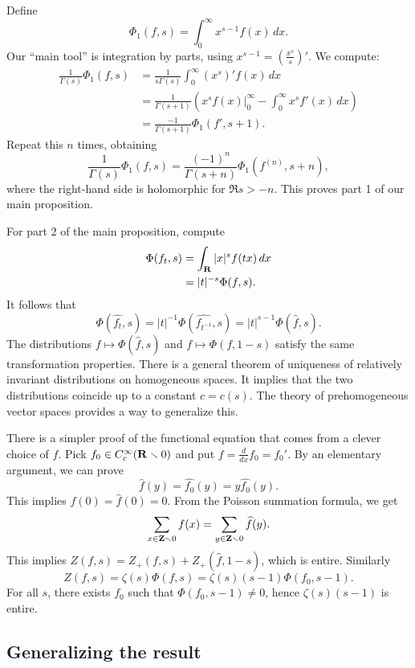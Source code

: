 Define 
\[
  \Phi_1(f,s) = \int_0^\infty x^{s-1} f(x)\, dx .
\]
Our ``main tool'' is integration by parts, using 
$x^{s-1} = \left(\frac{x^s}{s}\right)'$. We compute: 
\begin{align*}
  \frac{1}{\Gamma(s)} \Phi_1(f,s) 
    &= \frac{1}{s \Gamma(s)} \int_0^\infty (x^s)' f(x)\, dx \\
    &= \frac{1}{\Gamma(s+1)} \left(\left. x^s f(x)\right|_0^\infty - \int_0^\infty x^s f'(x)\, dx \right) \\
    &= \frac{-1}{\Gamma(s+1)} \Phi_1(f',s+1) .
\end{align*}
Repeat this $n$ times, obtaining 
\[
  \frac{1}{\Gamma(s)} \Phi_1(f,s) = \frac{(-1)^n}{\Gamma(s+n)} \Phi_1(f^{(n)},s+n) ,
\]
where the right-hand side is holomorphic for $\Re s>-n$. This proves part 1 of 
our main proposition. 

For part 2 of the main proposition, compute 
\begin{align*}
  \Phi(f_t,s) 
    &= \int_{\mathbf{R}} |x|^s f(t x)\, dx \\
    &= |t|^{-s} \Phi(f,s) .
\end{align*}
It follows that  
\[
  \Phi(\widehat{f_t},s) = |t|^{-1} \Phi(\widehat{f_{t^{-1}}},s) = |t|^{s-1} \Phi(\widehat f,s) .
\]
The distributions $f\mapsto \Phi(\widehat f,s)$ and $f\mapsto \Phi(f,1-s)$ 
satisfy the same transformation properties. There is a general theorem of 
uniqueness of relatively invariant distributions on homogeneous spaces. It 
implies that the two distributions coincide up to a constant $c=c(s)$. 
The theory of prehomogeneous vector spaces provides a way to generalize this. 

There is a simpler proof of the functional equation that comes from a clever 
choice of $f$. Pick $f_0\in C_c^\infty(\mathbf{R}\smallsetminus 0)$ and put 
$f=\frac{d}{dx} f_0 = f_0'$. By an elementary argument, we can prove 
\[
  \widehat f(y) = \widehat{f_0}(y) = y \widehat{f_0}(y) .
\]
This implies $f(0) = \widehat f(0) = 0$. From the Poisson summation formula, 
we get 
\[
  \sum_{x\in \mathbf{Z}\smallsetminus 0} f(x) = \sum_{y\in \mathbf{Z}\smallsetminus 0} \widehat f(y) .
\]
This implies $Z(f,s) = Z_+(f,s) + Z_+(\widehat f,1-s)$, which is entire. 
Similarly 
\[
  Z(f,s) = \zeta(s) \Phi(f,s) = \zeta(s) (s-1) \Phi(f_0,s-1) .
\]
For all $s$, there exists $f_0$ such that $\Phi(f_0,s-1)\ne 0$, hence 
$\zeta(s)(s-1)$ is entire. 





\subsection{Generalizing the result}

